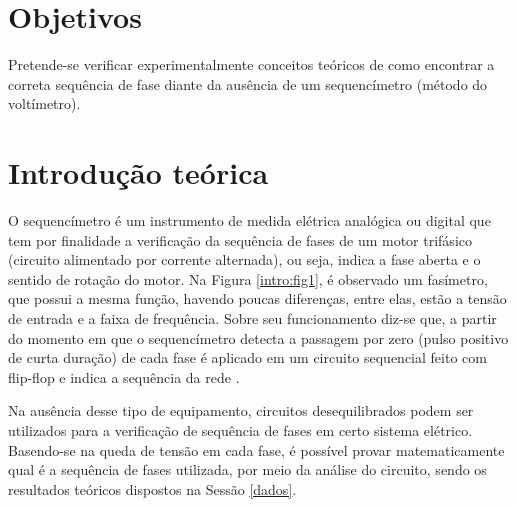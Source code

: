 \documentclass[a4paper,12pt,oneside,openany,table,xcdraw]{article}
\begin{document}
\newcommand{\thedepartment}{Faculdade de Engenharia Elétrica}
\newcommand{\thecourse}{FEELT}
\newcommand{\thetitle}{VERIFICAÇÃO DA SEQUÊNCIA DE FASES DAS TENSÕES}
\newcommand{\thetype}{Relatório da Disciplina de Experimental de Circuitos Elétricos II}
\newcommand{\theproftitle}{Bacharel em Engenharia Elétrica}
\newcommand{\thestudent}{Lesly Viviane Montúfar Berrios\\
\centering11811ETE001}
\newcommand{\theadvisor}{Prof. Wellington Maycon Santos Bernardes}
\newcommand{\thecity}{Uberlândia}

\thispagestyle{empty}


\onehalfspacing
\tableofcontents %
\newpage

\section{Objetivos} %
Pretende-se verificar experimentalmente conceitos teóricos de como encontrar a correta sequência de
fase diante da ausência de um sequencímetro (método do voltímetro).

\section{Introdução teórica} %

O sequencímetro é um instrumento de medida elétrica analógica ou digital que tem por  finalidade a verificação da sequência de fases de um motor trifásico (circuito alimentado por corrente alternada), ou seja, indica a fase aberta e o sentido de rotação do motor. Na Figura \ref{intro:fig1}, é observado um fasímetro, que possui a mesma função, havendo poucas diferenças, entre elas, estão a tensão de entrada e a faixa de frequência. Sobre seu funcionamento diz-se que, a partir do momento em que o sequencímetro detecta a passagem por zero (pulso positivo de curta duração) de cada fase é aplicado em um circuito sequencial feito com flip-flop e indica a sequência da rede \cite{UNIR}.

Na ausência desse tipo de equipamento, circuitos desequilibrados podem ser utilizados para a verificação de sequência de fases em certo sistema elétrico. Basendo-se na queda de tensão em cada fase, é possível provar matematicamente qual é a sequência de fases utilizada, por meio da análise do circuito, sendo os resultados teóricos dispostos na Sessão \ref{dados}.
\end{document}
